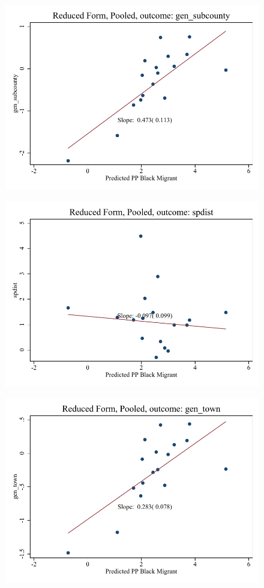\documentclass{article}
\begin{document}
\clearpage
\begin{figure}
	\centering
	\includegraphics[width=.8\textwidth]{figures/binscatter/pooled_gen_subcounty_rf.pdf}
\end{figure}
\clearpage
\begin{figure}
	\centering
	\includegraphics[width=.8\textwidth]{figures/binscatter/pooled_spdist_rf.pdf}
\end{figure}
\clearpage
\begin{figure}
	\centering
	\includegraphics[width=.8\textwidth]{figures/binscatter/pooled_gen_town_rf.pdf}
\end{figure}
\end{document}
